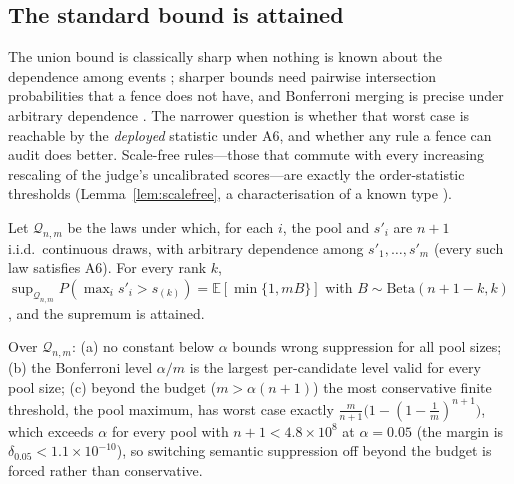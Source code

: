 \subsection{The standard bound is attained}\label{sec:tight}

The union bound is classically sharp when nothing is known about the dependence among events \citep{frechet1935,ruschendorf1982maxsums,galambos1996bonferroni}; sharper bounds need pairwise intersection probabilities \citep{hunter1976union,worsley1982bonferroni} that a fence does not have, and Bonferroni merging is precise under arbitrary dependence \citep{vovk2020averaging,vovk2022admissible}. The narrower question is whether that worst case is reachable by the \emph{deployed} statistic under A6, and whether any rule a fence can audit does better. Scale-free rules---those that commute with every increasing rescaling of the judge's uncalibrated scores---are exactly the order-statistic thresholds (Lemma~\ref{lem:scalefree}, a characterisation of a known type \citep{ovchinnikov1997invariant,marichal2002order}).

\begin{theorem}\label{thm:tight}
Let $\mathcal{Q}_{n,m}$ be the laws under which, for each $i$, the pool and $s'_i$ are $n+1$ i.i.d.\ continuous draws, with arbitrary dependence among $s'_1,\dots,s'_m$ (every such law satisfies A6). For every rank $k$, $\sup_{\mathcal{Q}_{n,m}}P(\max_is'_i>s_{(k)})=\mathbb{E}[\min\{1,mB\}]$ with $B\sim\mathrm{Beta}(n+1-k,k)$, and the supremum is attained.
\end{theorem}

\begin{corollary}\label{cor:tight}
Over $\mathcal{Q}_{n,m}$: (a) no constant below $\alpha$ bounds wrong suppression for all pool sizes; (b) the Bonferroni level $\alpha/m$ is the largest per-candidate level valid for every pool size; (c) beyond the budget ($m>\alpha(n+1)$) the most conservative finite threshold, the pool maximum, has worst case exactly $\frac{m}{n+1}\big(1-(1-\frac1m)^{n+1}\big)$, which exceeds $\alpha$ for every pool with $n+1<4.8\times10^8$ at $\alpha=0.05$ (the margin is $\delta_{0.05}<1.1\times10^{-10}$), so switching semantic suppression off beyond the budget is forced rather than conservative.
\end{corollary}

